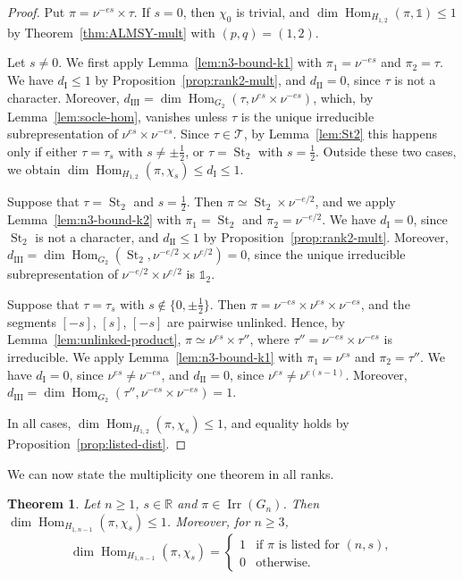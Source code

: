 \documentclass[11pt]{amsart}
\numberwithin{equation}{section}
\theoremstyle{plain}
\newtheorem{theorem}{Theorem}[section]
\theoremstyle{definition}
\theoremstyle{remark}
\newcommand{\R}{\mathbb{R}}
\newcommand{\one}{\mathds{1}}
\newcommand{\T}{\mathcal{T}}
\DeclareMathOperator{\Hom}{Hom}
\DeclareMathOperator{\Irr}{Irr}
\DeclareMathOperator{\St}{St}
\newcommand{\dI}{d_{\mathrm{I}}}
\newcommand{\dII}{d_{\mathrm{II}}}
\newcommand{\dIII}{d_{\mathrm{III}}}
\begin{document}
\begin{proof}
	Put $\pi=\nu^{-es}\times\tau$. If $s=0$, then $\chi_0$ is trivial, and $\dim\Hom_{H_{1,2}}(\pi,\one)\le1$ by Theorem~\ref{thm:ALMSY-mult} with $(p,q)=(1,2)$.
	
	Let $s\ne0$. We first apply Lemma~\ref{lem:n3-bound-k1} with $\pi_1=\nu^{-es}$ and $\pi_2=\tau$. We have $\dI\le1$ by Proposition~\ref{prop:rank2-mult}, and $\dII=0$, since $\tau$ is not a character. Moreover, $\dIII=\dim\Hom_{G_2}(\tau,\nu^{es}\times\nu^{-es})$, which, by Lemma~\ref{lem:socle-hom}, vanishes unless $\tau$ is the unique irreducible subrepresentation of $\nu^{es}\times\nu^{-es}$. Since $\tau\in\T$, by Lemma~\ref{lem:St2} this happens only if either $\tau=\tau_s$ with $s\ne\pm\frac12$, or $\tau=\St_2$ with $s=\frac12$. Outside these two cases, we obtain $\dim\Hom_{H_{1,2}}(\pi,\chi_s)\le\dI\le1$.
	
	Suppose that $\tau=\St_2$ and $s=\frac12$. Then $\pi\simeq\St_2\times\nu^{-e/2}$, and we apply Lemma~\ref{lem:n3-bound-k2} with $\pi_1=\St_2$ and $\pi_2=\nu^{-e/2}$. We have $\dI=0$, since $\St_2$ is not a character, and $\dII\le1$ by Proposition~\ref{prop:rank2-mult}. Moreover, $\dIII=\dim\Hom_{G_2}(\St_2,\nu^{-e/2}\times\nu^{e/2})=0$, since the unique irreducible subrepresentation of $\nu^{-e/2}\times\nu^{e/2}$ is $\one_2$.
	
	Suppose that $\tau=\tau_s$ with $s\notin\{0,\pm\frac12\}$. Then $\pi=\nu^{-es}\times\nu^{es}\times\nu^{-es}$, and the segments $[-s]$, $[s]$, $[-s]$ are pairwise unlinked. Hence, by Lemma~\ref{lem:unlinked-product}, $\pi\simeq\nu^{es}\times\tau''$, where $\tau''=\nu^{-es}\times\nu^{-es}$ is irreducible. We apply Lemma~\ref{lem:n3-bound-k1} with $\pi_1=\nu^{es}$ and $\pi_2=\tau''$. We have $\dI=0$, since $\nu^{es}\ne\nu^{-es}$, and $\dII=0$, since $\nu^{es}\ne\nu^{e(s-1)}$. Moreover, $\dIII=\dim\Hom_{G_2}(\tau'',\nu^{-es}\times\nu^{-es})=1$.
	
	In all cases, $\dim\Hom_{H_{1,2}}(\pi,\chi_s)\le1$, and equality holds by Proposition~\ref{prop:listed-dist}.
\end{proof}

We can now state the multiplicity one theorem in all ranks.

\begin{theorem}\label{thm:multiplicity}
	Let $n\ge1$, $s\in\R$ and $\pi\in\Irr(G_n)$. Then $\dim\Hom_{H_{1,n-1}}(\pi,\chi_s)\le1$. Moreover, for $n\ge3$,
	$$
	\dim\Hom_{H_{1,n-1}}(\pi,\chi_s)=\begin{cases}1&\text{if }\pi\text{ is listed for }(n,s),\\0&\text{otherwise.}\end{cases}$$
\end{theorem}
\end{document}
